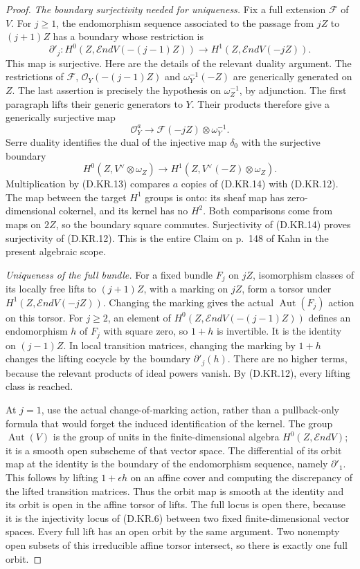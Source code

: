 \begin{proof}
\emph{The boundary surjectivity needed for uniqueness.}
Fix a full extension $\mathcal F$ of $V$. For $j\ge1$, the
endomorphism sequence associated to the passage from $jZ$ to
$(j+1)Z$ has a boundary whose restriction is
\[
 \partial'_j:
 H^0(Z,\mathcal End V(-(j-1)Z))
       \longrightarrow H^1(Z,\mathcal End V(-jZ)).     \tag{D.KR.12}
\]
This map is surjective. Here are the details of the relevant
duality argument. The restrictions of
$\mathcal F$, $\mathcal O_Y(-(j-1)Z)$ and
$\omega_Y^{-1}(-Z)$ are generically generated on $Z$.
The last assertion is precisely the hypothesis on
$\omega_Z^{-1}$, by adjunction. The first paragraph lifts
their generic generators to $Y$. Their products therefore
give a generically surjective map
\[
 \mathcal O_Y^a\longrightarrow
                  \mathcal F(-jZ)\otimes\omega_Y^{-1}.
                                                        \tag{D.KR.13}
\]
Serre duality identifies the dual of the injective map
$\delta_0$ with the surjective boundary
\[
 H^0(Z,V^\vee\otimes\omega_Z)
      \longrightarrow H^1(Z,V^\vee(-Z)\otimes\omega_Z).
                                                        \tag{D.KR.14}
\]
Multiplication by (D.KR.13) compares $a$ copies of
(D.KR.14) with (D.KR.12). The map between the target $H^1$
groups is onto: its sheaf map has zero-dimensional cokernel,
and its kernel has no $H^2$. Both comparisons come from maps
on $2Z$, so the boundary square commutes. Surjectivity of
(D.KR.14) proves surjectivity of (D.KR.12). This is the
entire Claim on p.~148 of Kahn in the present algebraic scope.

\emph{Uniqueness of the full bundle.}
For a fixed bundle $F_j$ on $jZ$, isomorphism classes of its
locally free lifts to $(j+1)Z$, with a marking on $jZ$, form
a torsor under $H^1(Z,\mathcal End V(-jZ))$.
Changing the marking gives the actual $\operatorname{Aut}(F_j)$
action on this torsor.
For $j\ge2$, an element of
$H^0(Z,\mathcal End V(-(j-1)Z))$ defines an endomorphism
$h$ of $F_j$ with square zero, so $1+h$ is invertible.
It is the identity on $(j-1)Z$. In local transition matrices,
changing the marking by $1+h$ changes the lifting cocycle by
the boundary $\partial'_j(h)$. There are no higher terms,
because the relevant products of ideal powers vanish.
By (D.KR.12), every lifting class is reached.

At $j=1$, use the actual change-of-marking action, rather
than a pullback-only formula that would forget the induced
identification of the kernel. The group
$\operatorname{Aut}(V)$ is the group of units in the
finite-dimensional algebra $H^0(Z,\mathcal End V)$; it is
a smooth open subscheme of that vector space. The differential
of its orbit map at the identity is the boundary of the
endomorphism sequence, namely $\partial'_1$. This follows
by lifting $1+\epsilon h$ on an affine cover and computing
the discrepancy of the lifted transition matrices.
Thus the orbit map is smooth at the identity and its orbit
is open in the affine torsor of lifts. The full locus is
open there, because it is the injectivity locus of (D.KR.6)
between two fixed finite-dimensional vector spaces.
Every full lift has an open orbit by the same argument.
Two nonempty open subsets of this irreducible affine torsor
intersect, so there is exactly one full orbit.


\end{proof}

